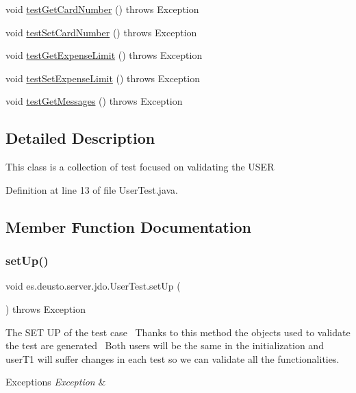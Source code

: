 \begin{DoxyCompactItemize}
void \hyperlink{classes_1_1deusto_1_1server_1_1jdo_1_1_user_test_ad84d7265ac6d2d4a9e9f3d42e80b8baf}{test\+Get\+Card\+Number} ()  throws Exception 
\item 
void \hyperlink{classes_1_1deusto_1_1server_1_1jdo_1_1_user_test_a944d9dbc5220860bbc5a8eeaf013d54e}{test\+Set\+Card\+Number} ()  throws Exception 
\item 
void \hyperlink{classes_1_1deusto_1_1server_1_1jdo_1_1_user_test_ac9953cb0f85111b005a731bc9706a3b5}{test\+Get\+Expense\+Limit} ()  throws Exception 
\item 
void \hyperlink{classes_1_1deusto_1_1server_1_1jdo_1_1_user_test_a62ce453431218996d80c2f0f57249513}{test\+Set\+Expense\+Limit} ()  throws Exception 
\item 
void \hyperlink{classes_1_1deusto_1_1server_1_1jdo_1_1_user_test_a73c44236a983959ce39adbd4803c83c1}{test\+Get\+Messages} ()  throws Exception 
\end{DoxyCompactItemize}


\subsection{Detailed Description}
This class is a collection of test focused on validating the U\+S\+ER 

Definition at line 13 of file User\+Test.\+java.



\subsection{Member Function Documentation}
\mbox{\label{classes_1_1deusto_1_1server_1_1jdo_1_1_user_test_ae4f4cc3f32659a36b3c5853d7789ccc5}} 
\subsubsection{\texorpdfstring{set\+Up()}{setUp()}}
{\footnotesize\ttfamily void es.\+deusto.\+server.\+jdo.\+User\+Test.\+set\+Up (\begin{DoxyParamCaption}{ }\end{DoxyParamCaption}) throws Exception}

The S\+ET UP of the test case~\newline
Thanks to this method the objects used to validate the test are generated~\newline
Both users will be the same in the initialization and user\+T1 will suffer changes in each test so we can validate all the functionalities. 
\begin{DoxyExceptions}{Exceptions}
{\em Exception} & \\
\hline
\end{DoxyExceptions}


